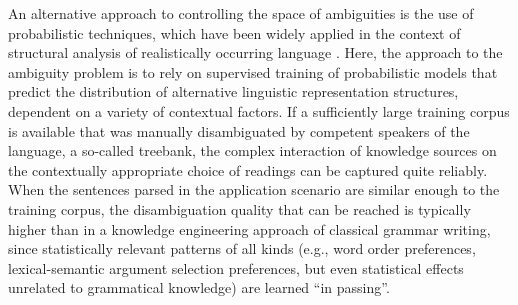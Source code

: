 \documentclass[output=paper,hidelinks]{langscibook}
\begin{document}
An alternative approach to controlling the space of ambiguities is the use of probabilistic techniques, which have been widely applied in the context of structural analysis of realistically occurring language \citep{collins-1997-three,riezler-etal-2000-lexicalized,Riezler2002King}. %
Here, the approach to the ambiguity problem is to rely on  supervised training of probabilistic models that predict the distribution of alternative linguistic representation structures, dependent on a variety of contextual factors. If a sufficiently large training corpus is available that was manually disambiguated by competent speakers of the language, a so-called treebank, the complex interaction of knowledge sources on the contextually appropriate choice of readings can be captured quite reliably. When the sentences parsed in the application scenario are similar enough to the training corpus, the disambiguation quality that can be reached is typically higher than in a knowledge engineering approach of classical grammar writing, since statistically relevant patterns of all kinds (e.g., word order preferences, lexical-semantic argument selection preferences, but even statistical effects unrelated to grammatical knowledge) are learned ``in passing''.
\end{document}
